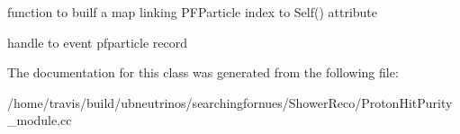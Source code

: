 function to builf a map linking P\+F\+Particle index to Self() attribute 

handle to event pfparticle record 

The documentation for this class was generated from the following file\+:\begin{DoxyCompactItemize}
\item 
/home/travis/build/ubneutrinos/searchingfornues/\+Shower\+Reco/Proton\+Hit\+Purity\+\_\+module.\+cc\end{DoxyCompactItemize}
